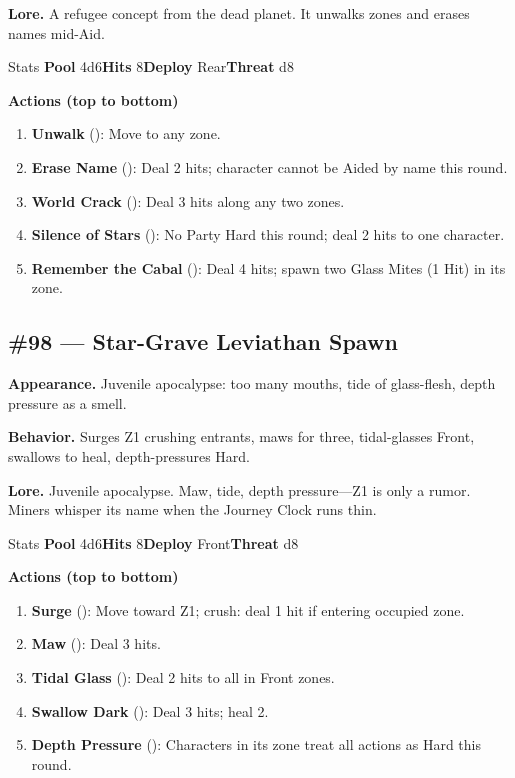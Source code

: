 \textbf{Lore.} A refugee concept from the dead planet. It unwalks zones and erases names mid-Aid.

\begin{monsterentry}{Stats}
\textbf{Pool} 4d6\quad\textbf{Hits} 8\quad\textbf{Deploy} Rear\quad\textbf{Threat} d8

\textbf{Actions (top to bottom)}
\begin{enumerate}\setlength{\itemsep}{0.15em}\setlength{\parskip}{0pt}
  \item \textbf{Unwalk} (\easy): Move to any zone.
  \item \textbf{Erase Name} (\medium): Deal 2 hits; character cannot be Aided by name this round.
  \item \textbf{World Crack} (\hard): Deal 3 hits along any two zones.
  \item \textbf{Silence of Stars} (\hard): No Party Hard this round; deal 2 hits to one character.
  \item \textbf{Remember the Cabal} (\hard): Deal 4 hits; spawn two Glass Mites (1 Hit) in its zone.
\end{enumerate}
\end{monsterentry}

\subsection*{\#98 --- Star-Grave Leviathan Spawn}

\textbf{Appearance.} Juvenile apocalypse: too many mouths, tide of glass-flesh, depth pressure as a smell.

\textbf{Behavior.} Surges Z1 crushing entrants, maws for three, tidal-glasses Front, swallows to heal, depth-pressures Hard.

\textbf{Lore.} Juvenile apocalypse. Maw, tide, depth pressure---Z1 is only a rumor. Miners whisper its name when the Journey Clock runs thin.

\begin{monsterentry}{Stats}
\textbf{Pool} 4d6\quad\textbf{Hits} 8\quad\textbf{Deploy} Front\quad\textbf{Threat} d8

\textbf{Actions (top to bottom)}
\begin{enumerate}\setlength{\itemsep}{0.15em}\setlength{\parskip}{0pt}
  \item \textbf{Surge} (\easy): Move toward Z1; crush: deal 1 hit if entering occupied zone.
  \item \textbf{Maw} (\medium): Deal 3 hits.
  \item \textbf{Tidal Glass} (\hard): Deal 2 hits to all in Front zones.
  \item \textbf{Swallow Dark} (\hard): Deal 3 hits; heal 2.
  \item \textbf{Depth Pressure} (\hard): Characters in its zone treat all actions as Hard this round.
\end{enumerate}
\end{monsterentry}

